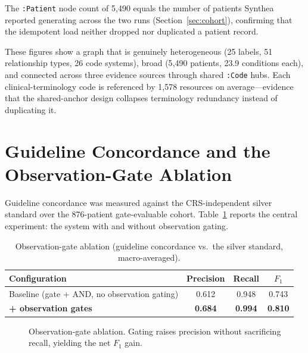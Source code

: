 The \texttt{:Patient} node count of 5{,}490 equals the number of patients Synthea reported
generating across the two runs (Section~\ref{sec:cohort}), confirming that the idempotent
load neither dropped nor duplicated a patient record.

These figures show a graph that is genuinely heterogeneous (25 labels, 51 relationship
types, 26 code systems), broad (5{,}490 patients, 23.9
conditions each), and connected across three evidence sources through shared \texttt{:Code}
hubs. Each clinical-terminology code is referenced by 1{,}578 resources on
average---evidence that the shared-anchor design collapses terminology redundancy instead of
duplicating it.

\section{Guideline Concordance and the Observation-Gate Ablation}
\label{sec:ablation}

Guideline concordance was measured against the CRS-independent silver standard over the
876-patient gate-evaluable cohort. Table~\ref{tab:ablation} reports the
central experiment: the system with and without observation gating.

\begin{table}[h]
\centering
\caption{Observation-gate ablation (guideline concordance vs.\ the silver standard,
macro-averaged).}
\label{tab:ablation}
\begin{tabular}{lccc}
\hline
\textbf{Configuration} & \textbf{Precision} & \textbf{Recall} & \textbf{$F_1$} \\
\hline
Baseline (gate + AND, no observation gating) & 0.612 & 0.948 & 0.743 \\
\textbf{+ observation gates}                  & \textbf{0.684} & \textbf{0.994} & \textbf{0.810} \\
\hline
\end{tabular}
\end{table}

\begin{figure}[htbp]
\centering
{}
\caption{Observation-gate ablation. Gating raises precision without sacrificing recall,
yielding the net $F_1$ gain.}
\label{fig:ablation}
\end{figure}

